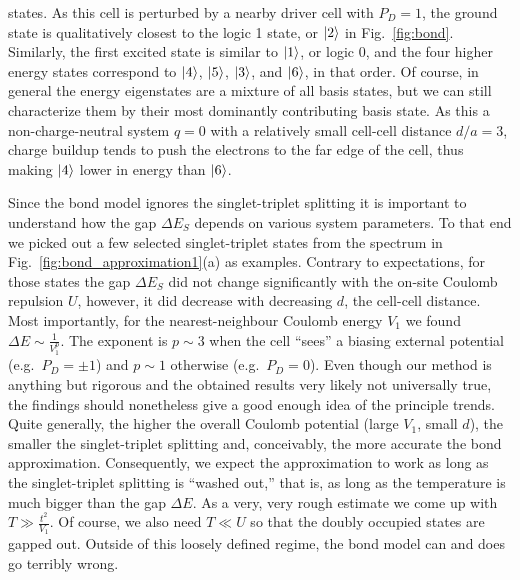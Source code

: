 states. As this cell is perturbed by a nearby driver cell with $P_D = 1$, the
ground state is qualitatively closest to the logic 1 state, or $\left|2\right>$ in
Fig.~\ref{fig:bond}.  Similarly, the first excited state is similar to
$\left|1\right>$, or logic 0, and the four higher energy states correspond to
$\left|4\right>$, $\left|5\right>$, $\left|3\right>$, and $\left|6\right>$, in that order. Of course, in
general the energy eigenstates are a mixture of all basis states, but we can
still characterize them by their most dominantly contributing basis state. As
this a non-charge-neutral system $q=0$ with a relatively small cell-cell
distance $d/a = 3$, charge buildup tends to push the electrons to the far edge
of the cell, thus making $\left|4\right>$ lower in energy than $\left|6\right>$.

Since the bond model ignores the singlet-triplet splitting it is important to
understand how the gap $\Delta E_S$ depends on various system parameters. To
that end we picked out a few selected singlet-triplet states from the spectrum
in Fig.~\ref{fig:bond_approximation1}(a) as examples. Contrary to expectations,
for those states the gap $\Delta E_S$ did not change significantly with the
on-site Coulomb repulsion $U$, however, it did decrease with decreasing $d$, the
cell-cell distance. Most importantly, for the nearest-neighbour Coulomb energy
$V_1$ we found $\Delta E \sim \frac{1}{V_1^p}$. The exponent is $p \sim 3$ when
the cell ``sees'' a biasing external potential (e.g.\ $P_D = \pm 1$) and $p \sim
1$ otherwise (e.g.\ $P_D = 0$). Even though our method is anything but rigorous
and the obtained results very likely not universally true, the findings should
nonetheless give a good enough idea of the principle trends. Quite generally,
the higher the overall Coulomb potential (large $V_1$, small $d$), the smaller
the singlet-triplet splitting and, conceivably, the more accurate the bond
approximation. Consequently, we expect the approximation to work as long as the
singlet-triplet splitting is ``washed out,'' that is, as long as the temperature
is much bigger than the gap $\Delta E$. As a very, very rough estimate we come
up with $T \gg \frac{t^2}{V_1}$. Of course, we also need $T \ll U$ so that the
doubly occupied states are gapped out. Outside of this loosely defined regime,
the bond model can and does go terribly wrong.


